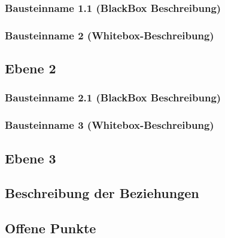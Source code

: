 \subsubsection{Bausteinname 1.1 (BlackBox Beschreibung)}


\subsubsection{ Bausteinname 2 (Whitebox-Beschreibung)}


\subsection{Ebene 2}

\subsubsection{Bausteinname 2.1 (BlackBox Beschreibung)}

\subsubsection{Bausteinname 3 (Whitebox-Beschreibung)}


\subsection{Ebene 3}

\subsection{Beschreibung der Beziehungen}

\subsection{Offene Punkte}
